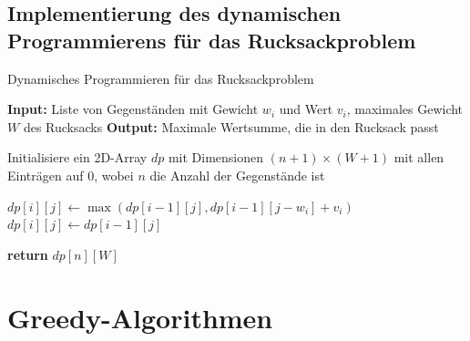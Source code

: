 \documentclass[12pt]{report}
\begin{document}
\section{Implementierung des dynamischen Programmierens für das Rucksackproblem}
\begin{algorithm}
	\caption{Dynamisches Programmieren für das Rucksackproblem}
	\begin{algorithmic}[1]
		\State \textbf{Input:} Liste von Gegenständen mit Gewicht $w_i$ und Wert $v_i$, maximales Gewicht $W$ des Rucksacks
		\State \textbf{Output:} Maximale Wertsumme, die in den Rucksack passt
		
		\State Initialisiere ein 2D-Array $dp$ mit Dimensionen $(n+1) \times (W+1)$ mit allen Einträgen auf $0$, wobei $n$ die Anzahl der Gegenstände ist
		
		\State $dp[i][j] \gets \max(dp[i-1][j], dp[i-1][j-w_i] + v_i)$
		\Else
		\State $dp[i][j] \gets dp[i-1][j]$
		\EndIf
		\EndFor
		\EndFor
		
		\State \textbf{return} $dp[n][W]$
	\end{algorithmic}
\end{algorithm}



\chapter{Greedy-Algorithmen}

\end{document}
